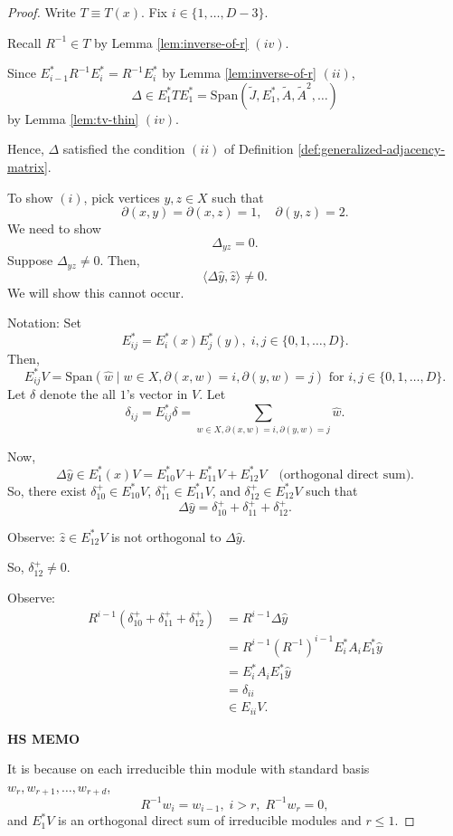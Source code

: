 \documentclass[
]{book}
\theoremstyle{definition}
\theoremstyle{definition}
\theoremstyle{definition}
\theoremstyle{definition}
\theoremstyle{remark}
\begin{document}
\begin{proof}
Write \(T \equiv T(x)\). Fix \(i\in \{1, \ldots, D-3\}\).

Recall \(R^{-1}\in T\) by Lemma \ref{lem:inverse-of-r} \((iv)\).

Since \(E^*_{i-1}R^{-1}E^*_i = R^{-1}E^*_i\) by Lemma \ref{lem:inverse-of-r} \((ii)\),
\[\Delta \in E^*_1TE^*_1 = \mathrm{Span}(\tilde{J}, E^*_1, \tilde{A}, \tilde{A}^2, \ldots)\]
by Lemma \ref{lem:tv-thin} \((iv)\).

Hence, \(\Delta\) satisfied the condition \((ii)\) of Definition \ref{def:generalized-adjacency-matrix}.

To show \((i)\), pick vertices \(y,z\in X\) such that
\[\partial(x,y) = \partial(x,z) = 1, \quad \partial(y,z) = 2.\]
We need to show
\[\Delta_{yz} = 0.\]
Suppose \(\Delta_{yz}\neq 0\). Then,
\[\langle \Delta\hat{y},\hat{z}\rangle \neq 0.\]
We will show this cannot occur.

Notation: Set
\[E^*_{ij} = E^*_i(x)E^*_j(y), \; i,j\in \{0, 1, \ldots, D\}.\]
Then,
\[E^*_{ij}V = \mathrm{Span}(\hat{w}\mid w\in X, \partial(x,w)=i, \partial(y,w)=j) \text{ for } i,j\in \{0, 1, \ldots, D\}.\]
Let \(\delta\) denote the all \(1\)'s vector in \(V\). Let
\[\delta_{ij} = E^*_{ij}\delta = \sum_{w\in X, \partial(x,w)=i, \partial(y,w)=j}\hat{w}.\]

Now,
\[\Delta\hat{y} \in E^*_1(x)V = E^*_{10}V + E^*_{11}V + E^*_{12}V \quad \text{(orthogonal direct sum)}.\]
So, there exist \(\delta^+_{10}\in E^*_{10}V\), \(\delta^+_{11}\in E^*_{11}V\), and \(\delta^+_{12}\in E^*_{12}V\) such that
\[\Delta \hat{y} = \delta^+_{10} + \delta^+_{11} + \delta^+_{12}.\]

Observe: \(\hat{z}\in E^*_{12}V\) is not orthogonal to \(\Delta \hat{y}\).

So, \(\delta^+_{12}\neq 0\).

Observe:
\begin{align}
R^{i-1}(\delta^+_{10} + \delta^+_{11} + \delta^+_{12}) & = R^{i-1}\Delta\hat{y}\\
& = R^{i-1}(R^{-1})^{i-1}E^*_iA_iE^*_1\hat{y}\\
& = E^*_iA_iE^*_1\hat{y}\\
& = \delta_{ii}\\
& \in E_{ii}V.
\end{align}

\textbf{HS MEMO}

It is because on each irreducible thin module with standard basis \(w_r, w_{r+1}, \ldots, w_{r+d}\),
\[R^{-1}w_i = w_{i-1}, \; i>r, \; R^{-1}w_r = 0,\]
and \(E^*_1V\) is an orthogonal direct sum of irreducible modules and \(r\leq 1\).


\end{proof}
\end{document}
